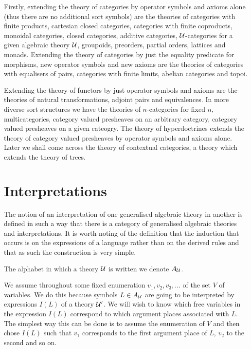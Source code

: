 Firstly, extending the theory of categories by operator symbols and axioms alone (thus there are no additional sort symbols) are the theories of categories with finite products, cartesian closed categories, categories with finite coproducts, monoidal categories, closed categories, additive categories, $\mathcal{U}$-categories for a given algebraic theory $\mathcal{U}$, groupoids, preorders, partial orders, lattices and monads.
%
 Extending the theory of categories by just the equality predicate for morphisms, new operator symbols and new axioms are the theories of categories with equalisers of pairs, categories with finite limits, abelian categories and topoi.

Extending the theory of functors by just operator symbols and axioms are the theories of natural transformations, adjoint pairs and equivalences.
%
 In more diverse sort structures we have the theories of $n$-categories for fixed $n$, multicategories, category valued presheaves on an arbitrary category, category valued presheaves on a given cateogry.
%
 The theory of hyperdoctrines extends the theory of category valued presheaves by operator symbols and axioms alone.
%
 Later we shall come across the theory of contextual categories, a theory which extends the theory of trees.

\section{Interpretations} \label{sec:source-1-11}

The notion of an interpretation of one generalised algebraic theory in another is defined in such a way that there is a category of generalised algebraic theories and interpretations.
%
 It is worth noting of the definition that the induction that occurs is on the expressions of a language rather than on the derived rules and that as such the construction is very simple.

The alphabet in which a theory $\mathcal{U}$ is written we denote $A_{\mathcal{U}}$.

We assume throughout some fixed enumeration $v_1,v_2,v_3,\ldots$ of the set $V$ of variables.
%
 We do this because symbols $L\in A_{\mathcal{U}}$ are going to be interpreted by expressions $I(L)$ of a theory $\mathcal{U}'$.
%
 We will wish to know which free variables in the expression $I(L)$ correspond to which argument places associated with $L$.
%
 The simplest way this can be done is to assume the enumeration of $V$ and then chose $I(L)$ such that $v_1$ corresponds to the first argument place of $L$, $v_2$ to the second and so on.

